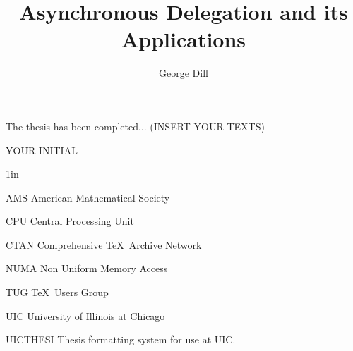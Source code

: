 \documentclass{uicthesi}
\begin{document}

\title{Asynchronous Delegation and its Applications}
\author{George Dill}
\maketitle




 \acknowledgements
{The thesis has been completed... (INSERT YOUR TEXTS)\\ 

\begin{flushright}YOUR INITIAL\end{flushright}}


\preface


\tableofcontents
\listoftables
\listoffigures
\listofabbreviations
\begin{list}
{}
{\setlength
  {}{1in}
    \setlength{\leftmargin}{1.5in}
    \setlength{\labelsep}{.5in}
    \setlength{\rightmargin}{\leftmargin}}
\item[AMS\hfill] American Mathematical Society
\item[CPU\hfill] Central Processing Unit
\item[CTAN\hfill] Comprehensive \TeX\ Archive Network
\item[NUMA\hfill] Non Uniform Memory Access
\item[TUG\hfill] \TeX\ Users Group
\item[UIC\hfill] University of Illinois at Chicago
\item[UICTHESI\hfill] Thesis formatting system for use at UIC.
\end{list}
 
\end{document}

